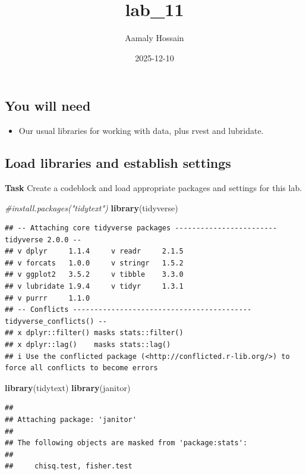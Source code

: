 \documentclass[
]{article}
\title{lab\_11}
\author{Aamaly Hossain}
\date{2025-12-10}
\newenvironment{Shaded}{\begin{snugshade}}{\end{snugshade}}
\newcommand{\CommentTok}[1]{\textcolor[rgb]{0.56,0.35,0.01}{\textit{#1}}}
\newcommand{\FunctionTok}[1]{\textcolor[rgb]{0.13,0.29,0.53}{\textbf{#1}}}
\newcommand{\NormalTok}[1]{#1}
\providecommand{\tightlist}{%
  \setlength{\itemsep}{0pt}\setlength{\parskip}{0pt}}
\begin{document}
\maketitle

\subsection{You will need}\label{you-will-need}

\begin{itemize}
\tightlist
\item
  Our usual libraries for working with data, plus rvest and lubridate.
\end{itemize}

\subsection{Load libraries and establish
settings}\label{load-libraries-and-establish-settings}

\textbf{Task} Create a codeblock and load appropriate packages and
settings for this lab.

\begin{Shaded}
\begin{Highlighting}[]
\CommentTok{\#install.packages("tidytext")}
\FunctionTok{library}\NormalTok{(tidyverse)}
\end{Highlighting}
\end{Shaded}

\begin{verbatim}
## -- Attaching core tidyverse packages ------------------------ tidyverse 2.0.0 --
## v dplyr     1.1.4     v readr     2.1.5
## v forcats   1.0.0     v stringr   1.5.2
## v ggplot2   3.5.2     v tibble    3.3.0
## v lubridate 1.9.4     v tidyr     1.3.1
## v purrr     1.1.0     
## -- Conflicts ------------------------------------------ tidyverse_conflicts() --
## x dplyr::filter() masks stats::filter()
## x dplyr::lag()    masks stats::lag()
## i Use the conflicted package (<http://conflicted.r-lib.org/>) to force all conflicts to become errors
\end{verbatim}

\begin{Shaded}
\begin{Highlighting}[]
\FunctionTok{library}\NormalTok{(tidytext)}
\FunctionTok{library}\NormalTok{(janitor)}
\end{Highlighting}
\end{Shaded}

\begin{verbatim}
## 
## Attaching package: 'janitor'
## 
## The following objects are masked from 'package:stats':
## 
##     chisq.test, fisher.test
\end{verbatim}
\end{document}
